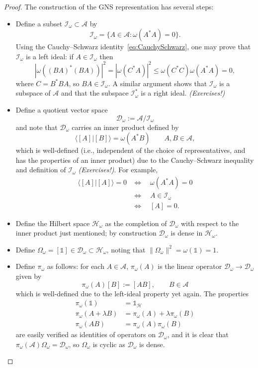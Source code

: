 \documentclass[12pt,a4paper]{article}
\newcommand{\1}{\mathds{1}}                         %
\newcommand{\HH}{{\mathcal{H}}}
\newcommand{\DD}{{\mathscr{D}}}
\newcommand{\II}{{\mathbb{1}}}
\newcommand{\Ac}{{\mathcal{A}}}
\newcommand{\Ic}{{\mathcal{I}}}
\newcommand{\ip}[2]{\langle #1|#2\rangle}
\begin{document}
\begin{proof}
	The construction of the GNS representation has several steps:
	\begin{itemize}
		\item Define a subset $\Ic_\omega\subset \Ac$ by 
		\[
		\Ic_\omega = \{A\in\Ac: \omega(A^*A)=0\}.
		\]
		Using the Cauchy--Schwarz identity~\eqref{eq:CauchySchwarz}, one may prove that $\Ic_\omega$ is a left ideal: if $A\in\Ic_\omega$ then
		\[
		|\omega((BA)^*(BA))|^2 = |\omega(C^*A)|^2\le \omega(C^*C)\omega(A^*A) = 0,
		\]
		where $C=B^*BA$, 
		so $BA\in\Ic_\omega$. A similar argument shows that $\Ic_\omega$ is a subspace of $\Ac$ and that
		the subspace $\Ic_\omega^*$ is a right ideal. \emph{(Exercises!)}
		\item Define a quotient vector space
		\[
		\DD_\omega :=\Ac/\Ic_\omega
		\]
		and note that $\DD_\omega$ carries an inner product defined by 
		\[
		\ip{[A]}{[B]} = \omega(A^*B) \qquad A,B\in\Ac,
		\]
		which is well-defined (i.e., independent of the choice of representatives, and has the properties of an inner product) due to the Cauchy--Schwarz inequality and definition of $\Ic_\omega$ \emph{(Exercises!)}. For example,
		\begin{align*}
		\ip{[A]}{[A]} = 0 & \iff\quad \omega(A^*A)=0 \\
		&\iff\quad A\in\Ic_\omega \\
		& \iff\quad[A]=0.
		\end{align*}
		\item Define the Hilbert space $\HH_\omega$ as the completion of $\DD_\omega$ with respect to the inner product just mentioned; by construction $\DD_\omega$ is dense in $\HH_\omega$. 
		\item Define $\Omega_\omega = [\II]\in\DD_\omega\subset\HH_\omega$, noting that
		$\|\Omega_\omega\|^2 = \omega(\II) = 1$.
		\item Define $\pi_\omega$ as follows: for each $A\in\Ac$, $\pi_\omega(A)$ is the linear operator $\DD_\omega\to\DD_\omega$ given by 
		\[
		\pi_\omega(A)[B] := [AB],\qquad B\in\Ac
		\]
		which is well-defined due to the left-ideal property yet again.
		The properties
		\begin{align*}
		\pi_\omega(\II) &= \II_\HH   \\
		\pi_\omega(A+\lambda B) &= \pi_\omega(A)+ \lambda\pi_\omega(B) \\
		\pi_\omega(AB) &= \pi_\omega(A)\pi_\omega(B) 
		\end{align*}
		are easily verified as identities of operators on $\DD_\omega$, and
		it is clear that $\pi_\omega(\Ac)\Omega_\omega=\DD_\omega$, so $\Omega_\omega$ is cyclic as $\DD_\omega$ is dense.
		

\end{itemize}
\end{proof}
\end{document}
